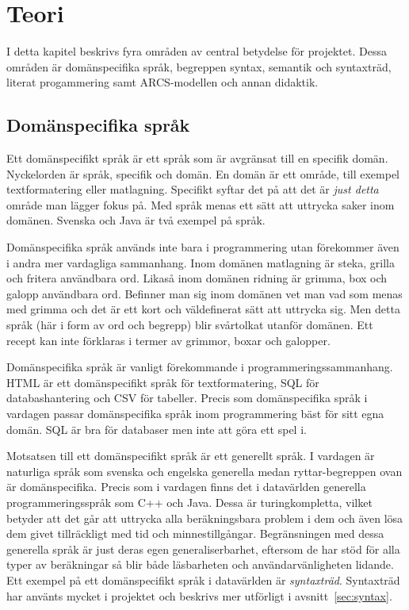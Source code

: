 
\chapter{Teori}

\begin{draft}

I detta kapitel beskrivs fyra områden av central betydelse för projektet. Dessa
områden är domänspecifika språk, begreppen syntax, semantik och syntaxträd,
literat progammering samt ARCS-modellen och annan didaktik.

\section{Domänspecifika språk}

Ett domänspecifikt språk är ett språk som är avgränsat till en specifik domän.
Nyckelorden är språk, specifik och domän. En domän är ett område, till exempel
textformatering eller matlagning. Specifikt syftar det på att det är \textit{just
detta} område man lägger fokus på. Med språk menas ett sätt att uttrycka
saker inom domänen. Svenska och Java är två exempel på språk.

Domänspecifika språk används inte bara i programmering utan förekommer även i
andra mer vardagliga sammanhang. Inom domänen matlagning är steka, grilla och
fritera användbara ord. Likaså inom domänen ridning är grimma, box och galopp
användbara ord. Befinner man sig inom domänen vet man vad som menas med grimma
och det är ett kort och väldefinerat sätt att uttrycka sig. Men detta språk (här
i form av ord och begrepp) blir svårtolkat utanför domänen. Ett recept kan inte
förklaras i termer av grimmor, boxar och galopper.

Domänspecifika språk är vanligt förekommande i programmeringssammanhang. HTML är
ett domänspecifikt språk för textformatering, SQL för databashantering och
CSV för tabeller. Precis som domänspecifika språk i vardagen passar
domänspecifika språk inom programmering bäst för sitt egna domän. SQL är bra för
databaser men inte att göra ett spel i.

Motsatsen till ett domänspecifikt språk är ett generellt språk. I vardagen är
naturliga språk som svenska och engelska generella medan ryttar-begreppen ovan
är domänspecifika. Precis som i vardagen finns det i datavärlden generella
programmeringsspråk som C++ och Java. Dessa är turingkompletta, vilket betyder
att det går att uttrycka alla beräkningsbara problem i dem och även lösa dem
givet tillräckligt med tid och
minnestillgångar\cite{turing_ne}\cite{turing_book}. Begränsningen med dessa
generella språk är just deras egen generaliserbarhet, eftersom de har stöd för
alla typer av beräkningar så blir både läsbarheten och användarvänligheten
lidande. Ett exempel på ett domänspecifikt språk i datavärlden är \textit{syntaxträd}. Syntaxträd har
använts mycket i projektet och beskrivs mer utförligt i
avsnitt~\ref{sec:syntax}.


\end{draft}
